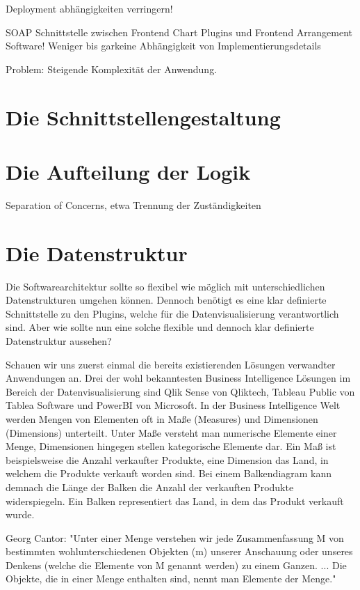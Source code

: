 Deployment abhängigkeiten verringern!

SOAP Schnittstelle zwischen Frontend Chart Plugins und Frontend Arrangement Software!
Weniger bis garkeine Abhängigkeit von Implementierungsdetails

Problem: Steigende Komplexität der Anwendung.

\section{Die Schnittstellengestaltung}

\section{Die Aufteilung der Logik}
\label{sec:die-aufteilung-der-logic}
Separation of Concerns, etwa Trennung der Zuständigkeiten

\section{Die Datenstruktur}
Die Softwarearchitektur sollte so flexibel wie möglich mit unterschiedlichen Datenstrukturen
umgehen können. Dennoch benötigt es eine klar definierte Schnittstelle zu den Plugins,
welche für die Datenvisualisierung verantwortlich sind. Aber wie sollte nun eine solche flexible 
und dennoch klar definierte Datenstruktur aussehen?

Schauen wir uns zuerst einmal die bereits existierenden Lösungen verwandter Anwendungen an. Drei der
wohl bekanntesten Business Intelligence Lösungen im Bereich der Datenvisualisierung sind Qlik Sense
von Qliktech, Tableau Public von Tablea Software und PowerBI von Microsoft. In der Business Intelligence
Welt werden Mengen von Elementen oft in Maße (Measures) und Dimensionen (Dimensions) unterteilt. Unter Maße versteht
man numerische Elemente einer Menge, Dimensionen hingegen stellen kategorische Elemente dar. Ein Maß
ist beispielsweise die Anzahl verkaufter Produkte, eine Dimension das Land, in welchem die Produkte verkauft worden
sind. Bei einem Balkendiagram kann demnach die Länge der Balken die Anzahl der verkauften Produkte
widerspiegeln. Ein Balken representiert das Land, in dem das Produkt verkauft wurde.


Georg Cantor: "Unter einer Menge verstehen wir jede Zusammenfassung M von bestimmten wohlunterschiedenen
Objekten (m) unserer Anschauung oder unseres Denkens (welche die Elemente von M genannt werden) zu einem Ganzen.
... Die Objekte, die in einer Menge enthalten sind, nennt man Elemente der Menge."

